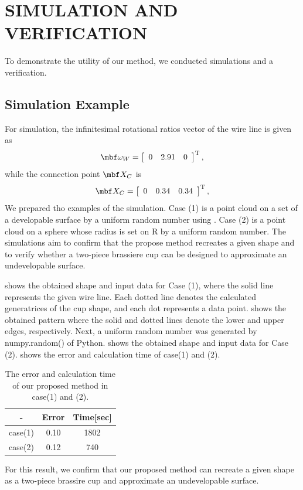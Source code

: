 \documentclass[E]{scitrans}
\begin{document}
\section*{SIMULATION AND VERIFICATION}
To demonstrate the utility of our method, we conducted simulations and a verification. 
\subsection*{Simulation Example}
For simulation, the infinitesimal rotational ratios vector   of the wire line is given as
\begin{equation}\label{eq:vrf_omgW}
	\mbold{\omega}_W = \left[ \begin{array}{ccc}
	0 & 2.91 & 0
	\end{array}\right]^\mathrm{T}, 
\end{equation}
while the connection point $ \mbold{X}_C $ is  
\begin{equation}\label{eq:givenXc}
	\mbold{X}_C = \left[ \begin{array}{ccc}
	0 & 0.34 & 0.34
	\end{array}\right]^\mathrm{T},
\end{equation}
We prepared tho examples of the simulation. Case (1) is a point cloud on a set of a developable surface by a uniform random number using . Case (2) is a point cloud on a sphere whose radius is set on R by a uniform random number. The simulations aim to confirm that the propose method recreates a given shape and to verify whether a two-piece brassiere cup can be designed to approximate an undevelopable surface.

 shows the obtained shape and input data for Case (1), where the solid line represents the given wire line. Each dotted line denotes the calculated generatrices of the cup shape, and each dot represents a data point.   shows the obtained pattern where the solid and dotted lines denote the lower and upper edges, respectively.
Next, a uniform random number was generated by numpy.random() of Python.  shows the obtained shape and input data for Case (2).  shows the error and calculation time of case(1) and (2).
\begin{table}[h]
	\centering
	\begin{tabular}{|c|c|c|} \hline
		-& Error & Time[sec] \\ \hline
		case(1) & 0.10 & 1802 \\ \hline
		case(2) & 0.12 & 740 \\ \hline
	\end{tabular}
	\caption{The error and calculation time of our proposed method in case(1) and (2).}
	\label{tbl:error and calc_Example}
\end{table}
For this result, we confirm that our proposed method can recreate a given shape as a two-piece brassire cup and approximate an undevelopable surface.
\end{document}
